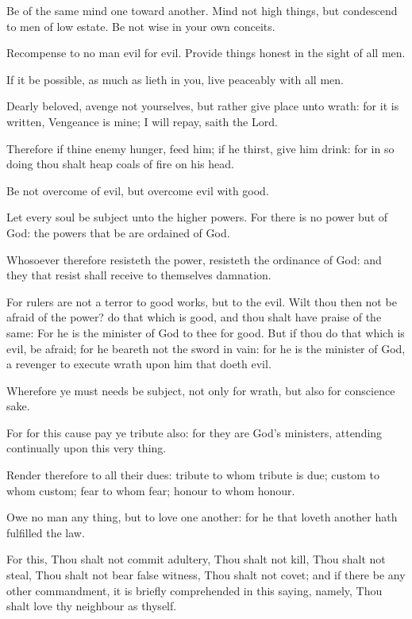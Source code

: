 \Verse Be of the same mind one toward another. Mind not high things, but condescend to men of low estate. Be not wise in your own conceits.

\Verse Recompense to no man evil for evil. Provide things honest in the sight of all men.

\Verse If it be possible, as much as lieth in you, live peaceably with all men.

\Verse Dearly beloved, avenge not yourselves, but rather give place unto wrath: for it is written, Vengeance is mine; I will repay, saith the Lord.

\Verse Therefore if thine enemy hunger, feed him; if he thirst, give him drink: for in so doing thou shalt heap coals of fire on his head.

\Verse Be not overcome of evil, but overcome evil with good.


\Chapter
\Verse Let every soul be subject unto the higher powers. For there is no power but of God: the powers that be are ordained of God.

\Verse Whosoever therefore resisteth the power, resisteth the ordinance of God: and they that resist shall receive to themselves damnation.

\Verse For rulers are not a terror to good works, but to the evil. Wilt thou then not be afraid of the power? do that which is good, and thou shalt have praise of the same: \Verse For he is the minister of God to thee for good. But if thou do that which is evil, be afraid; for he beareth not the sword in vain: for he is the minister of God, a revenger to execute wrath upon him that doeth evil.

\Verse Wherefore ye must needs be subject, not only for wrath, but also for conscience sake.

\Verse For for this cause pay ye tribute also: for they are God's ministers, attending continually upon this very thing.

\Verse Render therefore to all their dues: tribute to whom tribute is due; custom to whom custom; fear to whom fear; honour to whom honour.

\Verse Owe no man any thing, but to love one another: for he that loveth another hath fulfilled the law.

\Verse For this, Thou shalt not commit adultery, Thou shalt not kill, Thou shalt not steal, Thou shalt not bear false witness, Thou shalt not covet; and if there be any other commandment, it is briefly comprehended in this saying, namely, Thou shalt love thy neighbour as thyself.

